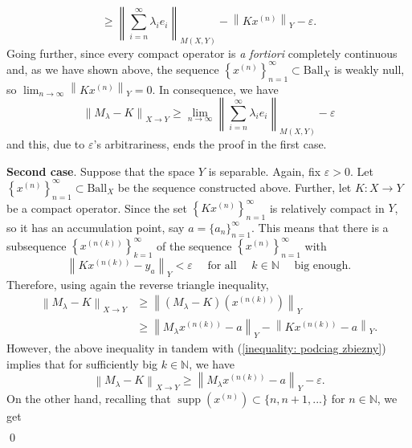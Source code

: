 \documentclass[11pt]{amsart}
\theoremstyle{definition}
\theoremstyle{definition}
\theoremstyle{definition}
\theoremstyle{definition}
\theoremstyle{definition}
\theoremstyle{definition}
\theoremstyle{definition}
\theoremstyle{definition}
\numberwithin{equation}{section}
\numberwithin{equation}{section}
\numberwithin{equation}{section}
\theoremstyle{definition}
\theoremstyle{definition}
\theoremstyle{definition}
\theoremstyle{definition}
\theoremstyle{definition}
\theoremstyle{definition}
\DeclareMathOperator{\supp}{supp}
\newcommand{\norm}[1]{\left\lVert#1\right\rVert}
\renewenvironment{proof}{\noindent {\bf Proof.}}{\qed}
\begin{document}
\begin{proof}
\begin{equation*}
			\geqslant \norm{ \sum_{i=n}^{\infty} \lambda_i e_i }_{M(X,Y)} -  \norm{K x^{(n)} }_Y - \varepsilon.
	\end{equation*}
	Going further, since every compact operator is {\it a fortiori} completely continuous and, as we have shown above, the sequence
	$\left\{ x^{(n)} \right\}_{n=1}^{\infty} \subset \text{Ball}_X$ is weakly null, so $\lim_{n \rightarrow \infty} \norm{K x^{(n)} }_Y = 0$.
	In consequence, we have
	\begin{equation*}
		\norm{M_{\lambda} - K}_{X \rightarrow Y} \geqslant \lim\limits_{n \rightarrow \infty} \norm{ \sum_{i=n}^{\infty} \lambda_i e_i }_{M(X,Y)} - \varepsilon
	\end{equation*}
	and this, due to $\varepsilon$'s arbitrariness, ends the proof in the first case.
	
	{\bf Second case}. Suppose that the space $Y$ is separable. Again, fix $\varepsilon > 0$. Let $\left\{ x^{(n)} \right\}_{n=1}^{\infty} \subset \text{Ball}_X$
	be the sequence constructed above. Further, let $K \colon X \rightarrow Y$ be a compact operator. Since the set $\left\{ K x^{(n)} \right\}_{n=1}^{\infty}$
	is relatively compact in $Y$, so it has an accumulation point, say $a = \{a_n\}_{n=1}^{\infty}$.
	This means that there is a subsequence $\left\{ x^{(n(k))} \right\}_{k=1}^{\infty}$ of the sequence $\left\{ x^{(n)} \right\}_{n=1}^{\infty}$ with
	\begin{equation}\label{inequality: podciag zbiezny}
		\norm{K x^{(n(k))} - y_a}_Y < \varepsilon \quad \text{ for all } \quad k \in \mathbb{N} \quad \text{ big enough}.
	\end{equation}
	Therefore, using again the reverse triangle inequality,
	\begin{align*}
		\norm{M_{\lambda} - K}_{X \rightarrow Y}
			& \geqslant \norm{(M_{\lambda} - K)( x^{(n(k))} )}_Y \\
			& \geqslant \norm{M_{\lambda} x^{(n(k))} - a}_Y - \norm{K x^{(n(k))} - a}_Y.
	\end{align*}
	However, the above inequality in tandem with (\ref{inequality: podciag zbiezny}) implies that for sufficiently big $k \in \mathbb{N}$, we have
	\begin{equation} \label{inequality: nierownosc ess seq}
		\norm{M_{\lambda} - K}_{X \rightarrow Y} \geqslant \norm{M_{\lambda} x^{(n(k))}  - a}_Y - \varepsilon.
	\end{equation}
	On the other hand, recalling that $\supp\left( x^{(n)} \right) \subset \{n, n+1, ...\}$ for $n \in \mathbb{N}$, we get
	\begin{align*}

\end{align*}
\end{proof}
\end{document}

